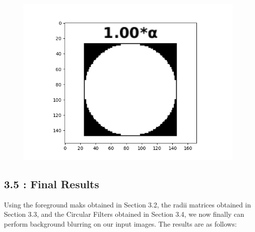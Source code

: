 \documentclass[12pt, a4paper]{article}
\begin{document}
\begin{figure}[h!]
\begin{minipage}[c][1\width]{0.19\textwidth}
    	\includegraphics[width=1.24\textwidth]{bird_kernel_1.00_cropped.png}
	    \label{fig:3.5(a)}
    \end{minipage}
\end{figure}
\newpage
\subsection*{3.5 : Final Results}
Using the foreground maks obtained in Section 3.2, the radii matrices obtained in Section 3.3, and the Circular Filters obtained in Section 3.4, we now finally can perform background blurring on our input images. The results are as follows:
\end{document}

